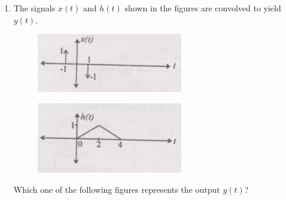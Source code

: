 \documentclass[journal]{IEEEtran}
\begin{document}
\begin{enumerate}
\begin{multicols}{2}
\begin{enumerate}
    \item $P = 0$, $Q = \frac{6}{\sqrt5}$
    \item $P = 0$, $Q = \frac{3}{\sqrt5}$
    \item $P = 5$, $Q = \frac{6}{\sqrt5}$
    \item $P = 5$, $Q = 3$
\end{enumerate}
\end{multicols}
\hfill(GATE IN 2007)
\item The signals $x(t)$ and $h(t)$ shown in the figures are convolved to yield $y(t)$. 
\begin{figure}[H]
    \centering
      \includegraphics[width=0.6\textwidth]{42.jpg} 
      \caption{}
    \label{fig:fig42} 
\end{figure}
\begin{figure}[H]
    \centering
      \includegraphics[width=0.6\textwidth]{43.jpg} 
      \caption{}
    \label{fig:fig43} 
\end{figure}
Which one of the following figures represents the output $y(t)$?


\end{enumerate}
\end{document}

